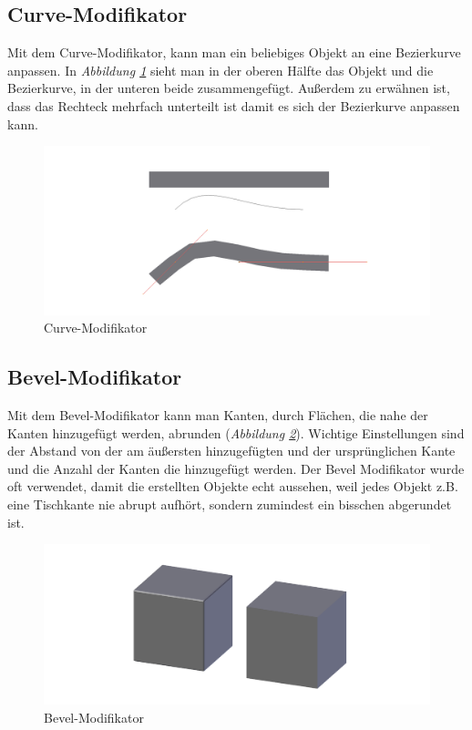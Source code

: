 \subsection{Curve-Modifikator}
\label{Curve:heading}
Mit dem Curve-Modifikator, kann man ein beliebiges Objekt an eine Bezierkurve anpassen.\citep{blender:curve_modifier} In \textit{Abbildung \ref{modifikatoren:image4}} sieht man
in der oberen Hälfte das Objekt und die Bezierkurve, in der unteren beide zusammengefügt.
Außerdem zu erwähnen ist, dass das Rechteck mehrfach unterteilt ist damit es sich der Bezierkurve anpassen kann.
\begin{figure}[h]
    \centering
    \includegraphics[width=.8\textwidth]{images/Modifikatoren-Curve.png}
    \caption{Curve-Modifikator}
    \label{modifikatoren:image4}
\end{figure}

\subsection{Bevel-Modifikator}
\label{Bevel:heading}
Mit dem Bevel-Modifikator kann man Kanten, durch Flächen, die nahe der Kanten hinzugefügt werden, abrunden (\textit{Abbildung \ref{modifikatoren:image5}}).\citep{blender:bevel_modifier}
Wichtige Einstellungen sind der Abstand von der am äußersten hinzugefügten und der ursprünglichen Kante und die Anzahl der Kanten die hinzugefügt werden.
Der Bevel Modifikator wurde oft verwendet, damit die erstellten Objekte echt aussehen, weil jedes Objekt z.B. eine Tischkante nie abrupt
aufhört, sondern zumindest ein bisschen abgerundet ist.
\begin{figure}[h]
    \centering
    \includegraphics[width=.8\textwidth]{images/Modifikatoren-Bevel.png}
    \caption{Bevel-Modifikator}
    \label{modifikatoren:image5}
\end{figure}

